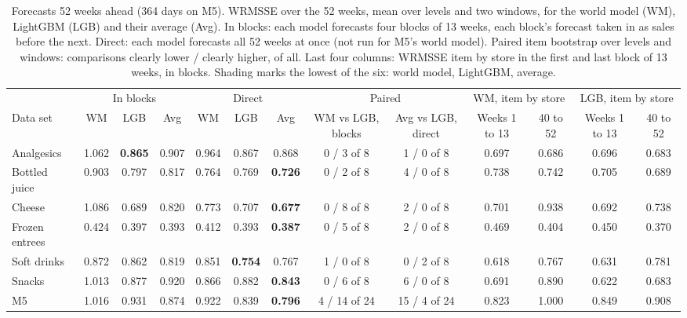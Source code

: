\begin{table}[t]
\centering\footnotesize\setlength{\tabcolsep}{3pt}
\caption{Forecasts 52 weeks ahead (364 days on M5). WRMSSE over the 52 weeks, mean over levels and two windows, for
the world model (WM), LightGBM (LGB) and their average (Avg). In blocks: each model forecasts four blocks of 13 weeks,
each block's forecast taken in as sales before the next. Direct: each model forecasts all 52 weeks at once (not run for
M5's world model). Paired item bootstrap over levels and windows: comparisons clearly lower / clearly higher, of all.
Last four columns: WRMSSE item by store in the first and last block of 13 weeks, in blocks. Shading marks the lowest
of the six: \colorbox{wmcell}{world model}, \colorbox{lgbcell}{LightGBM}, \colorbox{avgcell}{average}.}
\label{tab:long-horizon}
\begin{adjustbox}{max width=\textwidth}\begin{tabular}{l ccc ccc cc cc cc}
\toprule
 & \multicolumn{3}{c}{In blocks} & \multicolumn{3}{c}{Direct} & \multicolumn{2}{c}{Paired} & \multicolumn{2}{c}{WM, item by store} & \multicolumn{2}{c}{LGB, item by store}\\
\cmidrule(lr){2-4}\cmidrule(lr){5-7}\cmidrule(lr){8-9}\cmidrule(lr){10-11}\cmidrule(lr){12-13}
Data set & WM & LGB & Avg & WM & LGB & Avg & WM vs LGB, blocks & Avg vs LGB, direct & Weeks 1 to 13 & 40 to 52 & Weeks 1 to 13 & 40 to 52\\
\midrule
Analgesics & 1.062 & \cellcolor{lgbcell}\textbf{0.865} & 0.907 & 0.964 & 0.867 & 0.868 & 0 / 3 of 8 & 1 / 0 of 8 & 0.697 & 0.686 & 0.696 & 0.683 \\
Bottled juice & 0.903 & 0.797 & 0.817 & 0.764 & 0.769 & \cellcolor{avgcell}\textbf{0.726} & 0 / 2 of 8 & 4 / 0 of 8 & 0.738 & 0.742 & 0.705 & 0.689 \\
Cheese & 1.086 & 0.689 & 0.820 & 0.773 & 0.707 & \cellcolor{avgcell}\textbf{0.677} & 0 / 8 of 8 & 2 / 0 of 8 & 0.701 & 0.938 & 0.692 & 0.738 \\
Frozen entrees & 0.424 & 0.397 & 0.393 & 0.412 & 0.393 & \cellcolor{avgcell}\textbf{0.387} & 0 / 5 of 8 & 2 / 0 of 8 & 0.469 & 0.404 & 0.450 & 0.370 \\
Soft drinks & 0.872 & 0.862 & 0.819 & 0.851 & \cellcolor{lgbcell}\textbf{0.754} & 0.767 & 1 / 0 of 8 & 0 / 2 of 8 & 0.618 & 0.767 & 0.631 & 0.781 \\
Snacks & 1.013 & 0.877 & 0.920 & 0.866 & 0.882 & \cellcolor{avgcell}\textbf{0.843} & 0 / 6 of 8 & 6 / 0 of 8 & 0.691 & 0.890 & 0.622 & 0.683 \\
M5 & 1.016 & 0.931 & 0.874 & 0.922 & 0.839 & \cellcolor{avgcell}\textbf{0.796} & 4 / 14 of 24 & 15 / 4 of 24 & 0.823 & 1.000 & 0.849 & 0.908 \\
\bottomrule
\end{tabular}\end{adjustbox}
\end{table}
